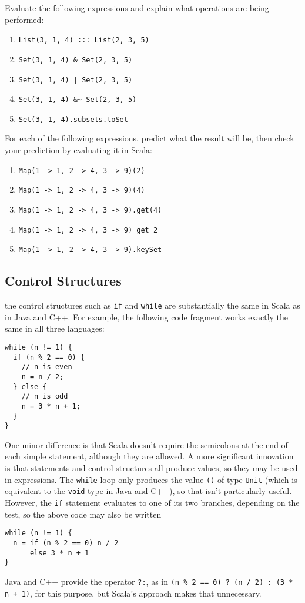 \begin{exercises}
\item Evaluate the following expressions and explain what operations are being performed:
\begin{enumerate}
\item \verb|List(3, 1, 4) ::: List(2, 3, 5)|
\item \verb|Set(3, 1, 4) & Set(2, 3, 5)|
\item \verb-Set(3, 1, 4) | Set(2, 3, 5)-
\item \verb|Set(3, 1, 4) &~ Set(2, 3, 5)|
\item \verb|Set(3, 1, 4).subsets.toSet|
\end{enumerate}

\item For each of the following expressions, predict what the result will be, then check your prediction by evaluating it in Scala:
\begin{enumerate}
\item \verb|Map(1 -> 1, 2 -> 4, 3 -> 9)(2)|
\item \verb|Map(1 -> 1, 2 -> 4, 3 -> 9)(4)|
\item \verb|Map(1 -> 1, 2 -> 4, 3 -> 9).get(4)|
\item \verb|Map(1 -> 1, 2 -> 4, 3 -> 9) get 2|
\item \verb|Map(1 -> 1, 2 -> 4, 3 -> 9).keySet|
\end{enumerate}

\end{exercises}

\subsection{Control Structures}
 the control structures such as \texttt{if} and \texttt{while} are substantially the same in Scala as in Java and C++. For example, the following code fragment works exactly the same in all three languages:
\begin{verbatim}
while (n != 1) {
  if (n % 2 == 0) {
    // n is even
    n = n / 2;
  } else {
    // n is odd
    n = 3 * n + 1;
  }
}
\end{verbatim}
One minor difference is that Scala doesn't require the semicolons at the end of each simple statement, although they are allowed. A more significant innovation is that statements and control structures all produce values, so they may be used in expressions. The \texttt{while} loop only produces the value \texttt{()} of type \texttt{Unit} (which is equivalent to the \texttt{void} type in Java and C++), so that isn't particularly useful. However, the \texttt{if} statement evaluates to one of its two branches, depending on the test, so the above code may also be written
\begin{verbatim}
while (n != 1) {
  n = if (n % 2 == 0) n / 2
      else 3 * n + 1
}
\end{verbatim}
Java and C++ provide the operator \texttt{?:}, as in \verb|(n % 2 == 0) ? (n / 2) : (3 * n + 1)|, for this purpose, but Scala's approach makes that unnecessary.

